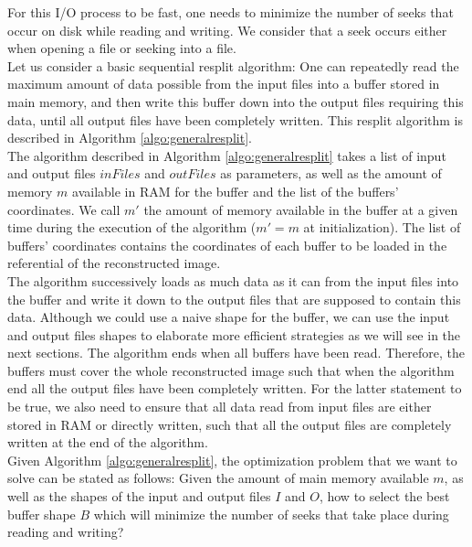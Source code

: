 \documentclass[conference]{IEEEtran}
\begin{document}
For this I/O process to be fast, one needs to minimize the number of seeks that occur on disk while reading and writing.
We consider that a seek occurs either when opening a file or seeking into a file. \\

Let us consider a basic sequential resplit algorithm: One can repeatedly read the maximum amount of data possible from the input files into a buffer stored in main memory, and then write this buffer down into the output files requiring this data, until all output files have been completely written.
This resplit algorithm is described in Algorithm \ref{algo:generalresplit}. \\

The algorithm described in Algorithm \ref{algo:generalresplit} takes a list of input and output files $inFiles$ and $outFiles$ as parameters, as well as the amount of memory $m$ available in RAM for the buffer and the list of the buffers' coordinates. We call $m'$ the amount of memory available in the buffer at a given time during the execution of the algorithm ($m'=m$ at initialization). The list of buffers' coordinates contains the coordinates of each buffer to be loaded in the referential of the reconstructed image. \\

The algorithm successively loads as much data as it can from the input files into the buffer and write it down to the output files that are supposed to contain this data.
Although we could use a naive shape for the buffer, we can use the input and output files shapes to elaborate more efficient strategies as we will see in the next sections.
The algorithm ends when all buffers have been read.
Therefore, the buffers must cover the whole reconstructed image such that when the algorithm end all the output files have been completely written.
For the latter statement to be true, we also need to ensure that all data read from input files are either stored in RAM or directly written, such that all the output files are completely written at the end of the algorithm. \\

Given Algorithm \ref{algo:generalresplit}, the optimization problem that we want to solve can be stated as follows:
Given the amount of main memory available $m$, as well as the shapes of the input and output files $I$ and $O$, how to select the best buffer shape $B$ which will minimize the number of seeks that take place during reading and writing? \\
\end{document}
